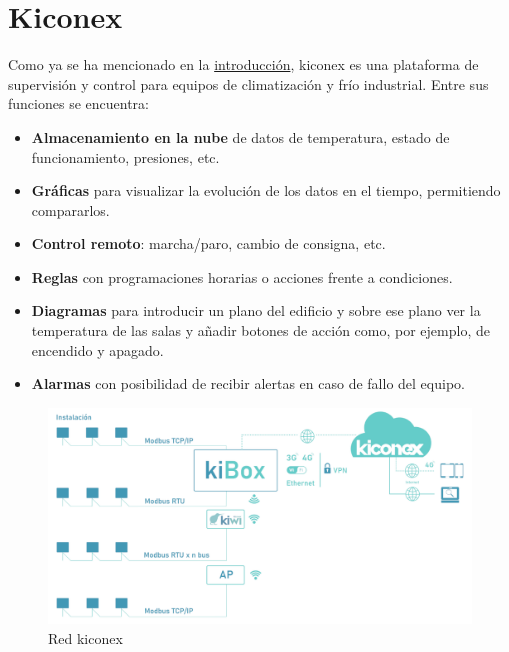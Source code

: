 
\section{Kiconex}
\label{sec:kiconex}

Como ya se ha mencionado en la \hyperref[chap:intro]{introducción}, kiconex es una plataforma de supervisión y control para equipos de climatización y frío industrial. Entre sus funciones se encuentra:
\begin{itemize}
  \item \textbf{Almacenamiento en la nube} de datos de temperatura, estado de funcionamiento, presiones, etc.  
  \item \textbf{Gráficas} para visualizar la evolución de los datos en el tiempo, permitiendo compararlos. 
  \item \textbf{Control remoto}: marcha/paro, cambio de consigna, etc.
  \item \textbf{Reglas} con programaciones horarias o acciones frente a condiciones. 
  \item \textbf{Diagramas} para introducir un plano del edificio y sobre ese plano ver la temperatura de las salas y añadir botones de acción como, por ejemplo, de encendido y apagado.
  \item \textbf{Alarmas} con posibilidad de recibir alertas en caso de fallo del equipo. 
\end{itemize}

\begin{figure}[H]
  \centering
  \includegraphics[width=\textwidth, keepaspectratio]{img/redKiconex}
  \caption{Red kiconex}
  \label{figura:redKiconex}
\end{figure}

